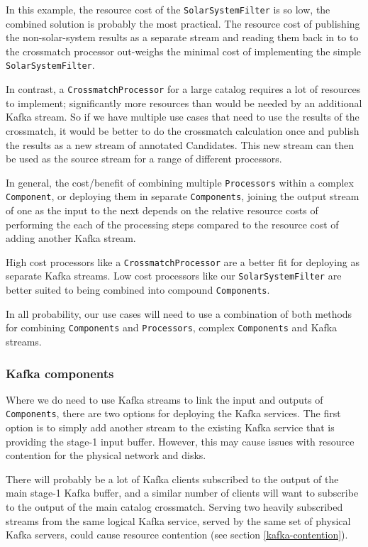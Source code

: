 \documentclass{article}
\newcommand{\kafka} {Kafka\xspace}
\newcommand{\crossmatch} {crossmatch\xspace}
\newcommand{\stageone} {stage-1\xspace}
\begin{document}
In this example, the resource cost of the \texttt{SolarSystemFilter} is so low, the combined solution is probably the most practical. The resource cost of publishing the non-solar-system results as a separate stream and reading them back in to to the \crossmatch processor out-weighs the minimal cost of implementing the simple \texttt{SolarSystemFilter}.

In contrast, a \texttt{CrossmatchProcessor} for a large catalog requires a lot of resources to implement; significantly more resources than would be needed by an additional \kafka stream. So if we have multiple use cases that need to use the results of the \crossmatch, it would be better to do the \crossmatch calculation once and publish the results as a new stream of annotated Candidates. This new stream can then be used as the source stream for a range of different processors.

In general, the cost/benefit of combining multiple \texttt{Processors} within a complex \texttt{Component}, or deploying them in separate \texttt{Components}, joining the output stream of one as the input to the next depends on the relative resource costs of performing the each of the processing steps compared to the resource cost of adding another Kafka stream.

High cost processors like a \texttt{CrossmatchProcessor} are a better fit for deploying as separate Kafka streams. Low cost processors like our \texttt{SolarSystemFilter} are better suited to being combined into compound \texttt{Components}.

In all probability, our use cases will need to use a combination of both methods for combining \texttt{Components} and \texttt{Processors}, complex \texttt{Components} and \kafka streams.

\subsubsection{Kafka components}
\label{workflow.kafka-components}

Where we do need to use \kafka streams to link the input and outputs of \texttt{Components}, there are two options for deploying the \kafka services. 
The first option is to simply add another stream to the existing \kafka service that is providing the \stageone input buffer. However, this may cause issues with resource contention for the physical network and disks.

There will probably be a lot of \kafka clients subscribed to the output of the main \stageone \kafka buffer, and a similar number of clients will want to subscribe to the output of the main catalog \crossmatch. Serving two heavily subscribed streams from the same logical \kafka service, served by the same set of physical \kafka servers, could cause resource contention (see section \ref{kafka-contention}).
\end{document}
